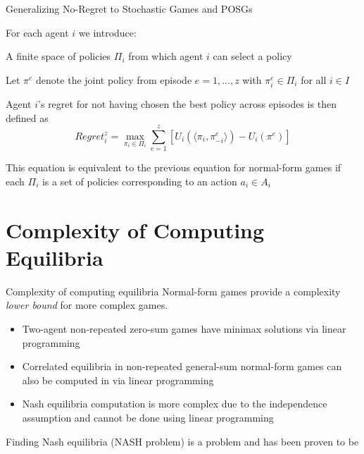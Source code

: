 \begin{frame}{Generalizing No-Regret to Stochastic Games and POSGs}

For each agent \(i\) we introduce:

\blist
    \item A finite space of policies $\Pi_i$  from which agent $i$ can select a policy
    \item Let $\pi^e$ denote the joint policy from episode $e = 1, ..., z$ with $\pi_i^e \in \Pi_i$ for all $i \in I$
    \item Agent $i$'s regret for not having chosen the best policy across episodes is then defined as
\elist
\[
Regret_i^{z} = \max_{\pi_i \in \Pi_i}\sum_{e = 1}^z\left[U_i(\langle \pi_i, \pi_{-i}^{e}\rangle) - U_i (\pi^e) \right]
\]

\begin{notebox}
    This equation is equivalent to the previous equation for normal-form games if each $\Pi_i$ is a set of  policies corresponding to an action $a_i \in A_i$ 
\end{notebox}

\end{frame}

\section{Complexity of Computing Equilibria}

\begin{frame}{Complexity of computing equilibria}
Normal-form games provide a complexity {\it lower bound} for more complex games.
  \begin{itemize}
    \item Two-agent non-repeated zero-sum games have  minimax solutions via linear programming
    \item Correlated equilibria in non-repeated general-sum normal-form games can also be computed in  via linear programming
    \item Nash equilibria computation is more complex due to the independence assumption  and cannot be done using linear programming
  \end{itemize}
  \begin{problembox}
 	Finding Nash equilibria (NASH problem) is a  problem and has been proven to be
  \end{problembox}
\end{frame}


